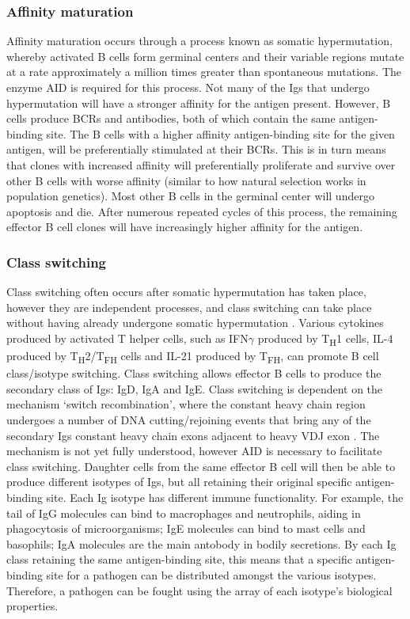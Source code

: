 \subsubsection{Affinity maturation}
Affinity maturation occurs through a process known as somatic hypermutation, whereby activated B cells form germinal centers and their variable regions mutate at a rate approximately a million times greater than spontaneous mutations.
The enzyme AID is required for this process.
Not many of the Igs that undergo hypermutation will have a stronger affinity for the antigen present.
However, B cells produce BCRs and antibodies, both of which contain the same antigen-binding site.
The B cells with a higher affinity antigen-binding site for the given antigen, will be preferentially stimulated at their BCRs.
This is in turn means that clones with increased affinity will preferentially proliferate and survive over other B cells with worse affinity (similar to how natural selection works in population genetics).
Most other B cells in the germinal center will undergo apoptosis and die.
After numerous repeated cycles of this process, the remaining effector B cell clones will have increasingly higher affinity for the antigen.

\subsubsection{Class switching}
Class switching often occurs after somatic hypermutation has taken place, however they are independent processes, and class switching can take place without having already undergone somatic hypermutation \cite{mak2014b}.
Various cytokines produced by activated T helper cells, such as IFN$\gamma$ produced by T\textsubscript{H}1 cells, IL-4 produced by T\textsubscript{H}2/T\textsubscript{FH} cells and IL-21 produced by T\textsubscript{FH}, can promote B cell class/isotype switching.
Class switching allows effector B cells to produce the secondary class of Igs: IgD, IgA and IgE\@.
Class switching is dependent on the mechanism `switch recombination', where the constant heavy chain region undergoes a number of DNA cutting/rejoining events that bring any of the secondary Igs constant heavy chain exons adjacent to heavy VDJ exon \cite{mak2014b}.
The mechanism is not yet fully understood, however AID is necessary to facilitate class switching.
Daughter cells from the same effector B cell will then be able to produce different isotypes of Igs, but all retaining their original specific antigen-binding site.
Each Ig isotype has different immune functionality.
For example, the tail of IgG molecules can bind to macrophages and neutrophils, aiding in phagocytosis of microorganisms; IgE molecules can bind to mast cells and basophils; IgA molecules are the main antobody in bodily secretions.
By each Ig class retaining the same antigen-binding site, this means that a specific antigen-binding site for a pathogen can be distributed amongst the various isotypes.
Therefore, a pathogen can be fought using the array of each isotype's biological properties.

